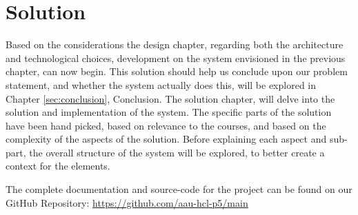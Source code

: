 \chapter{Solution}

Based on the considerations the design chapter, regarding both the architecture and technological choices, development on the system envisioned in the previous chapter, can now begin.
This solution should help us conclude upon our problem statement, and whether the system actually does this, will be explored in Chapter \ref{sec:conclusion}, Conclusion.
The solution chapter, will delve into the solution and implementation of the system.
The specific parts of the solution have been hand picked, based on relevance to the courses, and based on the complexity of the aspects of the solution.
Before explaining each aspect and sub-part, the overall structure of the system will be explored, to better create a context for the elements.

The complete documentation and source-code for the project can be found on our GitHub Repository: \url{https://github.com/aau-hcl-p5/main}



%





